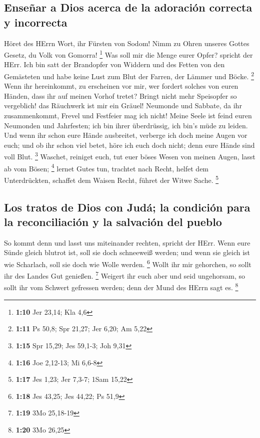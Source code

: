 \hypertarget{enseuxf1ar-a-dios-acerca-de-la-adoraciuxf3n-correcta-y-incorrecta}{%
\subsection{Enseñar a Dios acerca de la adoración correcta y
incorrecta}\label{enseuxf1ar-a-dios-acerca-de-la-adoraciuxf3n-correcta-y-incorrecta}}

 Höret des HErrn Wort, ihr Fürsten von Sodom! Nimm zu
Ohren unseres Gottes Gesetz, du Volk von Gomorra! \footnote{\textbf{1:10}
  Jer 23,14; Kla 4,6}  Was soll mir die Menge eurer
Opfer? spricht der HErr. Ich bin satt der Brandopfer von Widdern und des
Fetten von den Gemästeten und habe keine Lust zum Blut der Farren, der
Lämmer und Böcke. \footnote{\textbf{1:11} Ps 50,8; Spr 21,27; Jer 6,20;
  Am 5,22}  Wenn ihr hereinkommt, zu erscheinen vor mir,
wer fordert solches von euren Händen, dass ihr auf meinen Vorhof tretet?
 Bringt nicht mehr Speisopfer so vergeblich! das
Räuchwerk ist mir ein Gräuel! Neumonde und Sabbate, da ihr
zusammenkommt, Frevel und Festfeier mag ich nicht!  Meine
Seele ist feind euren Neumonden und Jahrfesten; ich bin ihrer
überdrüssig, ich bin's müde zu leiden.  Und wenn ihr
schon eure Hände ausbreitet, verberge ich doch meine Augen vor euch; und
ob ihr schon viel betet, höre ich euch doch nicht; denn eure Hände sind
voll Blut. \footnote{\textbf{1:15} Spr 15,29; Jes 59,1-3; Joh 9,31}
 Waschet, reiniget euch, tut euer böses Wesen von meinen
Augen, lasst ab vom Bösen; \footnote{\textbf{1:16} Joe 2,12-13; Mi 6,6-8}
 lernet Gutes tun, trachtet nach Recht, helfet dem
Unterdrückten, schaffet dem Waisen Recht, führet der Witwe Sache.
\footnote{\textbf{1:17} Jes 1,23; Jer 7,3-7; 1Sam 15,22}

\hypertarget{los-tratos-de-dios-con-juduxe1-la-condiciuxf3n-para-la-reconciliaciuxf3n-y-la-salvaciuxf3n-del-pueblo}{%
\subsection{Los tratos de Dios con Judá; la condición para la
reconciliación y la salvación del
pueblo}\label{los-tratos-de-dios-con-juduxe1-la-condiciuxf3n-para-la-reconciliaciuxf3n-y-la-salvaciuxf3n-del-pueblo}}

 So kommt denn und lasst uns miteinander rechten, spricht
der HErr. Wenn eure Sünde gleich blutrot ist, soll sie doch schneeweiß
werden; und wenn sie gleich ist wie Scharlach, soll sie doch wie Wolle
werden. \footnote{\textbf{1:18} Jes 43,25; Jes 44,22; Ps 51,9}
 Wollt ihr mir gehorchen, so sollt ihr des Landes Gut
genießen. \footnote{\textbf{1:19} 3Mo 25,18-19}  Weigert
ihr euch aber und seid ungehorsam, so sollt ihr vom Schwert gefressen
werden; denn der Mund des HErrn sagt es. \footnote{\textbf{1:20} 3Mo
  26,25}


